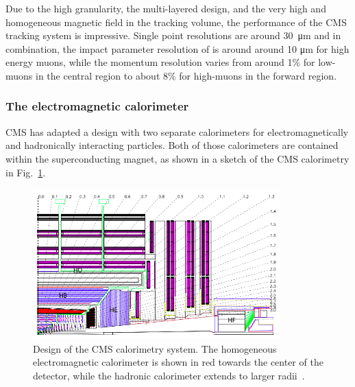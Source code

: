 Due to the high granularity,
the multi-layered design, and the very high and homogeneous magnetic field in the tracking volume, the performance of the CMS tracking system
is impressive. Single point resolutions are around \si{30 \micro\meter} and in combination, the impact parameter resolution of is around 
around 10 \si{\micro\meter} for high energy muons, while the momentum resolution varies from around 1\% for low-\pt muons in the central
region to about 8\% for high-\pt muons in the forward region.

\subsubsection*{The electromagnetic calorimeter}
CMS has adapted a design with two separate calorimeters for electromagnetically and hadronically interacting particles. Both of those
calorimeters are contained within the superconducting magnet, as shown in a sketch of the CMS calorimetry in Fig.~\ref{fig:cms_calo}. 

\begin{figure}[h!]
    \centering
    \includegraphics[width=0.85\textwidth]{../figs/cms_calo.png}
    \caption{Design of the CMS calorimetry system. The homogeneous electromagnetic calorimeter is shown in red towards
the center of the detector, while the hadronic calorimeter extends to larger radii~\cite{cmsdetector}.}
    \label{fig:cms_calo}
\end{figure}

